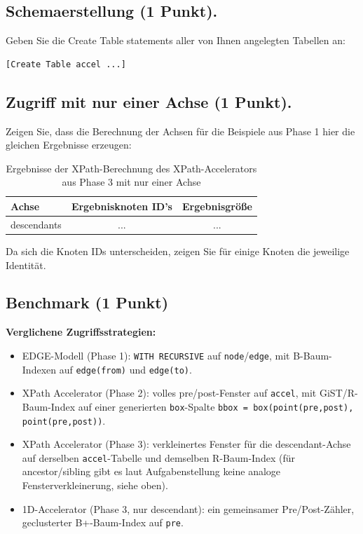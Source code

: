 \documentclass[11pt]{scrartcl}
\begin{document}
\subsection*{Schemaerstellung (1 Punkt).}
Geben Sie die Create Table statements aller von Ihnen angelegten Tabellen an:
\begin{lstlisting}[style=dmrsql]
[Create Table accel ...]
\end{lstlisting}

\subsection*{Zugriff mit nur einer Achse (1 Punkt).}
Zeigen Sie, dass die Berechnung der Achsen für die Beispiele aus Phase 1 hier die gleichen Ergebnisse erzeugen:

\begin{table}[h]
	\centering
		\begin{center}
			\begin{tabular}{ l | c c }
				\toprule
				Achse & Ergebnisknoten ID's & Ergebnisgröße\\
				\midrule
				descendants & ... & ... \\  
				\bottomrule
			\end{tabular}
			\end{center}
	\caption{Ergebnisse der XPath-Berechnung des XPath-Accelerators aus Phase 3 mit nur einer Achse}
	\label{tab:ErgebnisseDerXPathBerechnug}
\end{table}

Da sich die Knoten IDs unterscheiden, zeigen Sie für einige Knoten die jeweilige Identität.

\subsection*{Benchmark (1 Punkt)}

\textbf{Verglichene Zugriffsstrategien:}
\begin{itemize}
  \item[A] EDGE-Modell (Phase 1): \texttt{WITH RECURSIVE} auf \texttt{node}/\texttt{edge}, mit B-Baum-Indexen auf \texttt{edge(from)} und \texttt{edge(to)}.
  \item[B] XPath Accelerator (Phase 2): volles pre/post-Fenster auf \texttt{accel}, mit GiST/R-Baum-Index auf einer generierten \texttt{box}-Spalte \texttt{bbox = box(point(pre,post), point(pre,post))}.
  \item[C] XPath Accelerator (Phase 3): verkleinertes Fenster für die descendant-Achse auf derselben \texttt{accel}-Tabelle und demselben R-Baum-Index (für ancestor/sibling gibt es laut Aufgabenstellung keine analoge Fensterverkleinerung, siehe oben).
  \item[D] 1D-Accelerator (Phase 3, nur descendant): ein gemeinsamer Pre/Post-Zähler, geclusterter B+-Baum-Index auf \texttt{pre}.
\end{itemize}
\end{document}
